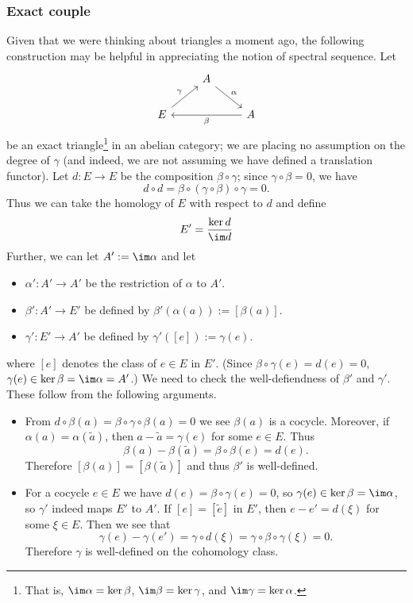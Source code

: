 \subsubsection{Exact couple}
Given that we were thinking about triangles a moment ago, the following construction may be helpful in appreciating the notion of spectral sequence. Let
\[\begin{tikzcd}
&A\ar[rd,"\alpha"]&\\
E\ar[ru,"\gamma"]&&A\ar[ll,"\beta"]
\end{tikzcd}\]
be an exact triangle\footnote{That is, $\im\alpha=\ker\beta$, $\im\beta=\ker\gamma$, and $\im\gamma=\ker\alpha$.} in an abelian category; we are placing no assumption on the degree of $\gamma$ (and indeed, we are not assuming we have defined a translation functor). Let $d:E\to E$ be the composition $\beta\circ\gamma$; since $\gamma\circ\beta=0$, we have
\[d\circ d=\beta\circ(\gamma\circ\beta)\circ\gamma=0.\]
Thus we can take the homology of $E$ with respect to $d$ and define
\[E'=\dfrac{\ker d}{\im d}\]
Further, we can let $A':=\im\alpha$ and let
\begin{itemize}
\item $\alpha':A'\to A'$ be the restriction of $\alpha$ to $A'$.
\item $\beta':A'\to E'$ be defined by $\beta'(\alpha(a)):=[\beta(a)]$.
\item $\gamma':E'\to A'$ be defined by $\gamma'([e]):=\gamma(e)$.
\end{itemize}
where $[e]$ denotes the class of $e\in E$ in $E'$. (Since $\beta\circ\gamma(e)=d(e)=0$, $\gamma(e)\in\ker\beta=\im\alpha=A'$.) 
We need to check the well-defiendness of $\beta'$ and $\gamma'$. These follow from the following arguments.
\begin{itemize}
\item From $d\circ\beta(a)=\beta\circ\gamma\circ\beta(a)=0$ we see $\beta(a)$ is a cocycle. Moreover, if $\alpha(a)=\alpha(\widetilde{a})$, then 
$a-\widetilde{a}=\gamma(e)$ for some $e\in E$. Thus
\[\beta(a)-\beta(\widetilde{a})=\beta\circ\beta(e)=d(e).\]
Therefore $[\beta(a)]=[\beta(\widetilde{a})]$ and thus $\beta'$ is well-defined.
\item For a cocycle $e\in E$ we have $d(e)=\beta\circ\gamma(e)=0$, so $\gamma(e)\in\ker\beta=\im\alpha$, so $\gamma'$ indeed maps $E'$ to $A'$. If $[e]=[\widetilde{e}]$ 
in $E'$, then $e-e'=d(\xi)$ for some $\xi\in E$. Then we see that
\[\gamma(e)-\gamma(e')=\gamma\circ d(\xi)=\gamma\circ\beta\circ\gamma(\xi)=0.\]
Therefore $\gamma$ is well-defined on the cohomology class.
\end{itemize}

